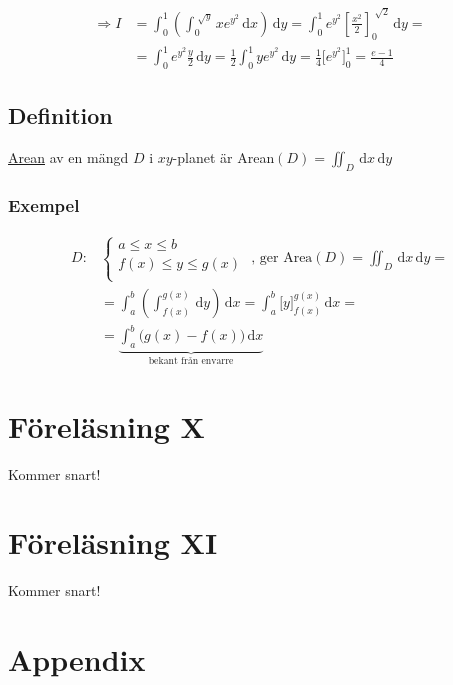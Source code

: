 \documentclass{article}
\let\oldsqrt\sqrt
\renewcommand*{\sqrt}[2][\ ]{\oldsqrt[#1]{#2} }
\begin{document}
\begin{align*}
	\Rightarrow I &= \int_0^1 \left( \int_0^{\sqrt{y}} xe^{y^2} \,\mathrm{d}x \right) \,\mathrm{d}y = \int_0^1 e^{y^2} \left[\frac{x^2}{2}\right]_0^{\sqrt{2}} \,\mathrm{d}y = \\
	              &= \int_0^1 e^{y^2} \frac{y}{2} \,\mathrm{d}y = \frac{1}{2} \int_0^1 ye^{y^2} \,\mathrm{d}y = \frac{1}{4} \Bigg[ e^{y^2} \Bigg]_0^1 = \frac{e-1}{4}
\end{align*}

\newpage
\subsection{Definition}
\underline{Arean} av en mängd $D$ i $xy$-planet är Arean$(D) = \iint_D \,\mathrm{d}x\,\mathrm{d}y$

\subsubsection{Exempel}

\begin{align*}
	D: &
	\begin{cases}
	a \leq x \leq b \\
	f(x) \leq y \leq g(x) \\
\end{cases}
\text{   , ger Area}(D) = \iint_D \,\mathrm{d}x\,\mathrm{d}y = \\
&= \int_a^b \left( \int_{f(x)}^{g(x)} \,\mathrm{d}y \right) \,\mathrm{d}x = \int_a^b \Bigg[ y \Bigg]_{f(x)}^{g(x)} \,\mathrm{d}x = \\
&= \underbrace{\int_a^b \Big(g(x) - f(x) \Big) \,\mathrm{d}x}_{\text{bekant från envarre}}
\end{align*}







\newpage
\section{Föreläsning X}

Kommer snart!




\newpage
\section{Föreläsning XI}

Kommer snart!









\newpage
\fancyhf{}
\section{Appendix}
\begin{appendix}
	\listoffigures
	\listoftables
\end{appendix}
\end{document}
